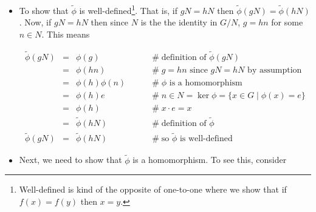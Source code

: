\documentclass[11pt, oneside]{article}   	%
\theoremstyle{definition}
\begin{document}
\begin{itemize}
\item To show that $\widetilde{\phi}$ is well-defined\footnote{Well-defined is kind of the opposite of one-to-one where we show that if $f(x) = f(y)$ then $x = y$.}. 
That is, if $gN = hN$ then $\widetilde{\phi}(gN) = \widetilde{\phi}(hN)$. Now, if $gN = hN$ then since $N$ is the the identity in $G/N$, $g = hn$ for some $n \in N$. This means

\begin{equation*}
\begin{array}{rcll}
\widetilde{\phi}(gN)
&=& \phi(g)                                                    &\qquad \mathrel{\#} \text{definition of $\widetilde{\phi}(gN)$}   \\
&=& \phi(hn)                                                  &\qquad \mathrel{\#}  g = hn \text{ since } gN = hN \text{ by assumption}  \\
&=& \phi(h)\phi(n)                                            &\qquad \mathrel{\#}  \text{$\phi$ is a homomorphism} \\
&=& \phi(h)e                                                  &\qquad \mathrel{\#}  n \in N = \ker \phi = \{x \in G  \mid \phi(x) = e\} \\
&=&  \phi(h)                                                   &\qquad \mathrel{\#}  x \cdot e = x  \\
&=& \widetilde{\phi}(hN)                                &\qquad \mathrel{\#}  \text{definition of $\widetilde{\phi}$} \\
\widetilde{\phi}(gN) &=& \widetilde{\phi}(hN)   &\qquad \mathrel{\#} \text{so $\widetilde{\phi}$ is well-defined}
\end{array}
\end{equation*}

\item Next, we need to show that $\widetilde{\phi}$ is a homomorphism. To see this, consider 


\end{itemize}
\end{document}
